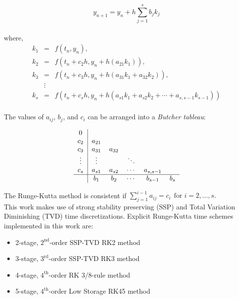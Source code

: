\documentclass[11pt]{book}
\begin{document}
\begin{appendices}
\begin{equation}
y_{n+1} = y_n + h \sum\limits_{j=1}^{s} b_{j}k_{j}
\end{equation}
\\
\noindent where,
\begin{eqnarray}
k_1 &=& f(t_n,y_n),                                     \nonumber \\
k_2 &=& f(t_n + c_2h,y_n + h(a_{21}k_1)),               \nonumber \\
k_3 &=& f(t_n + c_3h,y_n + h(a_{31}k_1 + a_{32}k_2)),             \\
&\vdots&                                                \nonumber \\
k_s &=& f(t_n + c_sh,y_n + h(a_{s1}k_1 + a_{s2}k_2 + \cdots + a_{s,s-1}k_{s-1})) \nonumber
\end{eqnarray}
\\
\noindent The values of $a_{ij}$, $b_{j}$, and $c_{i}$ can be arranged into 
a \textit{Butcher tableau}:

\begin{eqnarray}
\begin{tabular}{c|ccccc}
0\\
$c_2$    & $a_{21}$\\
$c_3$    & $a_{31}$ & $a_{32}$\\
$\vdots$ & $\vdots$ &           & $\ddots$\\
$c_s$    & $a_{s1}$ & $a_{s2}$  & $\cdots$ & $a_{s,s - 1}$\\
\hline
         & $b_1$    & $b_2$     & $\cdots$ & $b_{s-1}$     & $b_s$\\
\end{tabular}
\end{eqnarray}

\noindent
The Runge-Kutta method is consistent if
$\sum\limits_{j=1}^{i-1} a_{ij} = c_i \ \ \text{for } i = 2,\ldots,s.$\\
This work makes use of strong stability preserving (SSP) and 
Total Variation Diminishing (TVD) time discretizations.
Explicit Runge-Kutta time schemes implemented in this work are:

\begin{itemize}
\item 2-stage, $2^{\text{nd}}$-order SSP-TVD RK2 method
\item 3-stage, $3^{\text{rd}}$-order SSP-TVD RK3 method
\item 4-stage, $4^{\text{th}}$-order RK 3/8-rule method
\item 5-stage, $4^{\text{th}}$-order Low Storage RK45 method
\end{itemize}


\end{appendices}
\end{document}
